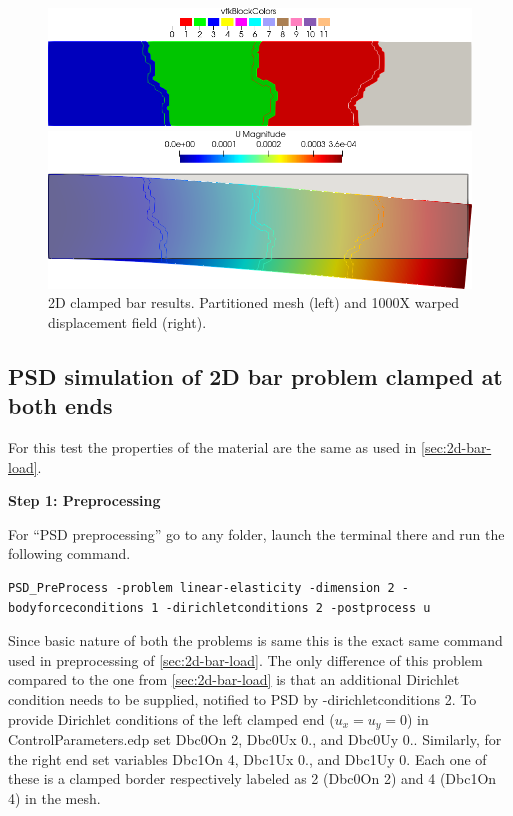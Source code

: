 {{\begin{figure}[htbp]
    \centering
    \begin{minipage}[t][2cm][t]{0.4\textwidth}
    \includegraphics[align=t,width=1\textwidth]{./Images/2d-bar-partioned.png}
    \end{minipage}\hspace{.1\textwidth}
    \begin{minipage}[t][2cm][t]{0.4\textwidth}
    \includegraphics[align=t,width=1\textwidth]{./Images/2d-bar-results.png}
    \end{minipage}
    \caption{2D clamped bar results. Partitioned mesh (left) and 1000X warped displacement field (right).}
    \label{fig:2d-bar-results}
\end{figure}


\subsection{PSD simulation of 2D bar problem clamped at both ends \label{sec:2D-bar-clamped1}}

For this test the properties of the material are the same as used in \cref{sec:2d-bar-load}. 

\textbf{Step 1: Preprocessing}

For ``PSD preprocessing'' go to any folder, launch the terminal there and run the following command.
\begin{lstlisting}[style=Linux]
PSD_PreProcess -problem linear-elasticity -dimension 2 -bodyforceconditions 1 -dirichletconditions 2 -postprocess u
\end{lstlisting}
%
Since basic nature of both the problems is same this is the exact same command used in preprocessing of \cref{sec:2d-bar-load}. The only difference of this problem compared to the one from \cref{sec:2d-bar-load} is that an additional Dirichlet condition needs to be supplied, notified to PSD by {\ttfamily -dirichletconditions 2}. To provide Dirichlet conditions of the left clamped end ($u_x=u_y=0$) in {\ttfamily ControlParameters.edp} set {\ttfamily Dbc0On 2}, {\ttfamily Dbc0Ux 0.}, and {\ttfamily Dbc0Uy 0.}. Similarly, for the right end set variables {\ttfamily Dbc1On 4}, {\ttfamily Dbc1Ux 0.}, and {\ttfamily Dbc1Uy 0}. Each one of these is a clamped border respectively labeled as 2  ({\ttfamily Dbc0On 2}) and 4 ({\ttfamily Dbc1On 4}) in the mesh.

}}
